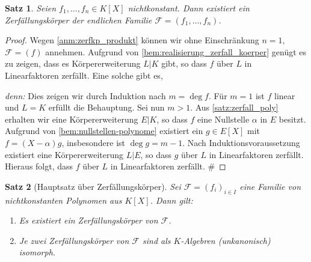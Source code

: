\documentclass[a4paper, twoside, 11pt, ngerman]{report}
\newcommand{\calF}{\mathcal F}
\theoremstyle{definistyle}
\newtheorem{satz}{Satz}[section]
\theoremstyle{remark}
\newenvironment{denn}%
  {\par\textit{denn:}}%
  {\hfill\#\par}
\begin{document}
\begin{satz}\label{satz:zerfkoerper_n_polynome}
Seien $f_1,\dots,f_n \in K[X]$ nichtkonstant. Dann existiert ein Zerfällungskörper der endlichen Familie $\calF=(f_1,\dots,f_n)$.
\end{satz}
\begin{proof}
Wegen \ref{anm:zerfkp_produkt} können wir ohne Einschränkung $n=1$, $\calF=(f)$ annehmen. 
Aufgrund von \ref{bem:realisierung_zerfall_koerper} genügt es zu zeigen, dass es Körpererweiterung $L|K$ gibt, so dass $f$ über $L$ in Linearfaktoren zerfällt. Eine solche gibt es,
\begin{denn}
Dies zeigen wir durch Induktion nach $m = \deg f$. Für $m=1$ ist $f$ linear und $L=K$ erfüllt die Behauptung. Sei nun $m>1$. Aus \ref{satz:zerfall_poly} erhalten wir eine Körpererweiterung $E|K$, so dass $f$ eine Nullstelle $\alpha$ in $E$ besitzt.
Aufgrund von \ref{bem:nullstellen-polynome} existiert ein $g\in E[X]$ mit  $f = (X - \alpha)g$, insbesondere ist $\deg g = m-1$.
Nach Induktionsvoraussetzung existiert eine Körpererweiterung $L|E$, so dass $g$ über $L$ in Linearfaktoren zerfällt. Hieraus folgt, dass $f$ über $L$ in Linearfaktoren zerfällt.
\end{denn}
\end{proof}

\begin{satz}[Hauptsatz über Zerfällungskörper]\label{satz:zerfkoerper_familie}
Sei $\calF=(f_i)_{i \in I}$ eine Familie von nichtkonstanten Polynomen aus $K[X]$. Dann gilt:
\begin{enumerate}
\item[(a)] Es existiert ein Zerfällungskörper von $\calF$.
\item[(b)] Je zwei Zerfällungskörper von $\calF$ sind als $K$-Algebren (unkanonisch) isomorph.
\end{enumerate}
\end{satz}
\end{document}
